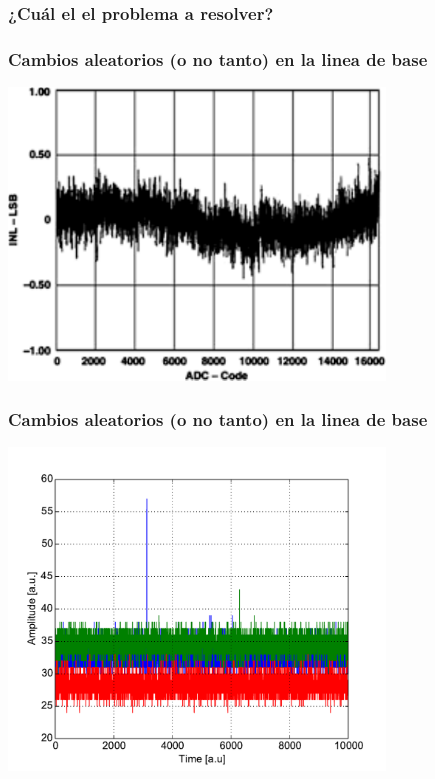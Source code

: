 \documentclass{beamer}
\begin{document}
\subsubsection{¿Cuál el el problema a resolver?}

\begin{frame}
  \frametitle{Cambios aleatorios (o no tanto) en la linea de base}
  \begin{block}{}
    \centering
    \includegraphics[height=0.55\textheight,width=0.75\textwidth]{d5/shifting_baseline}
  \end{block}
\end{frame}

\begin{frame}
  \frametitle{Cambios aleatorios (o no tanto) en la linea de base}
  \begin{block}{}
    \centering
    \includegraphics[height=0.55\textheight,width=0.75\textwidth]{d5/tres_chann2}
  \end{block}
\end{frame}
\end{document}
